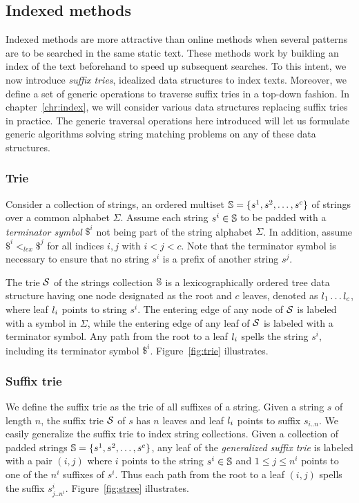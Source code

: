 \subsection{Indexed methods}
\label{sub:introindex}


Indexed methods are more attractive than online methods when several patterns are to be searched in the same static text.
These methods work by building an index of the text beforehand to speed up subsequent searches.
To this intent, we now introduce \emph{suffix tries}, idealized data structures to index texts.
Moreover, we define a set of generic operations to traverse suffix tries in a top-down fashion.
In chapter~\ref{chr:index}, we will consider various data structures replacing suffix tries in practice.
The generic traversal operations here introduced will let us formulate generic algorithms solving string matching problems on any of these data structures.

\subsubsection{Trie}

Consider a collection of strings, \ie an ordered multiset $\S = \{ s^1, s^2, \dots, s^c \}$ of strings over a common alphabet $\Sigma$.
Assume \wlogs each string $s^i \in \S$ to be padded with a \emph{terminator symbol} $\$^i$ not being part of the string alphabet $\Sigma$.
In addition, assume $\$^i <_{lex} \$^j$ for all indices $i,j$ with $i < j < c$.
Note that the terminator symbol is necessary to ensure that no string $s^i$ is a prefix of another string $s^j$.

The trie $\Si$ of the strings collection $\S$ is a lexicographically ordered tree data structure having one node designated as the root and $c$ leaves, denoted as $\Ln_1 \dots \Ln_c$, where leaf $\Ln_i$ points to string $s^i$.
The entering edge of any node of $\Si$ is labeled with a symbol in $\Sigma$, while the entering edge of any leaf of $\Si$ is labeled with a terminator symbol.
Any path from the root to a leaf $\Ln_i$ spells the string $s^i$, including its terminator symbol $\$^i$.
Figure~\ref{fig:trie} illustrates.

\subsubsection{Suffix trie}

We define the suffix trie as the trie of all suffixes of a string.
Given a string $s$ of length $n$, the suffix trie $\Si$ of $s$ has $n$ leaves and leaf $\Ln_i$ points to suffix $s_{i..n}$.
We easily generalize the suffix trie to index string collections.
Given a collection of padded strings $\Sc = \{ s^1, s^2, \dots, s^c \}$, any leaf of the \emph{generalized suffix trie} is labeled with a pair $(i,j)$ where $i$ points to the string $s^i \in \Sc$ and $1 \leq j \leq n^i$ points to one of the $n^i$ suffixes of $s^i$.
Thus each path from the root to a leaf $(i,j)$ spells the suffix $s^i_{j..n^i}$.
Figure~\ref{fig:stree} illustrates.

